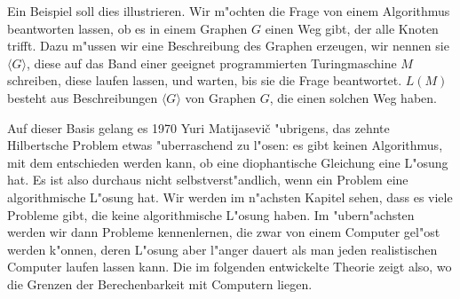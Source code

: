 Ein Beispiel soll dies illustrieren. Wir m"ochten die Frage
von einem Algorithmus beantworten lassen, ob es in einem Graphen $G$ 
einen Weg gibt, der alle Knoten trifft.  Dazu m"ussen wir eine
Beschreibung des Graphen erzeugen, wir nennen sie $\langle G\rangle$,
diese auf das Band einer geeignet programmierten Turingmaschine $M$ schreiben,
diese laufen lassen, und warten, bis sie die Frage beantwortet. $L(M)$
besteht aus Beschreibungen $\langle G\rangle$ von Graphen $G$, die
einen solchen Weg haben.

Auf dieser Basis gelang es 1970 Yuri Matijasevi\v c "ubrigens,
das zehnte Hilbertsche Problem etwas "uberraschend zu l"osen: es gibt
keinen Algorithmus, mit dem entschieden werden kann, ob eine 
diophantische Gleichung eine L"osung hat. Es ist also durchaus
nicht selbstverst"andlich, wenn ein Problem eine algorithmische
L"osung hat. Wir werden im n"achsten Kapitel sehen, dass es viele
Probleme gibt, die keine algorithmische L"osung haben. Im "ubern"achsten
werden wir dann Probleme kennenlernen, die zwar von einem Computer
gel"ost werden k"onnen, deren L"osung aber l"anger dauert als man
jeden realistischen Computer laufen lassen kann.
Die im folgenden entwickelte Theorie zeigt also, wo die Grenzen
der Berechenbarkeit mit Computern liegen.
